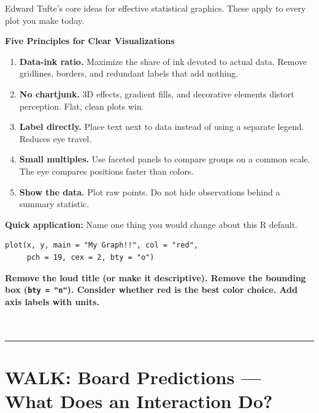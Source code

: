 \documentclass[12pt]{article}
\newcommand{\ans}[1]{%
    \ifthenelse{\boolean{showanswers}}%
        {\textcolor{rhodamine}{\textbf{#1}}}%
        {\textcolor{white}{\textbf{#1}}}%
}
\begin{document}
\noindent
Edward Tufte's core ideas for effective statistical graphics. These apply to every plot you make today.

\vspace{0.3cm}

\begin{frameworkbox}
\textbf{Five Principles for Clear Visualizations}

\begin{enumerate}[nosep]
    \item \textbf{Data-ink ratio.} Maximize the share of ink devoted to actual data. Remove gridlines, borders, and redundant labels that add nothing.
    \item \textbf{No chartjunk.} 3D effects, gradient fills, and decorative elements distort perception. Flat, clean plots win.
    \item \textbf{Label directly.} Place text next to data instead of using a separate legend. Reduces eye travel.
    \item \textbf{Small multiples.} Use faceted panels to compare groups on a common scale. The eye compares positions faster than colors.
    \item \textbf{Show the data.} Plot raw points. Do not hide observations behind a summary statistic.
\end{enumerate}
\end{frameworkbox}

\vspace{0.3cm}

\noindent
\textbf{Quick application:} Name one thing you would change about this R default.

\begin{verbatim}
plot(x, y, main = "My Graph!!", col = "red",
     pch = 19, cex = 2, bty = "o")
\end{verbatim}

\ans{Remove the loud title (or make it descriptive). Remove the bounding box (\texttt{bty = "n"}). Consider whether red is the best color choice. Add axis labels with units.}

\hrule

\newpage
\section*{WALK: Board Predictions --- What Does an Interaction Do?}
\end{document}
